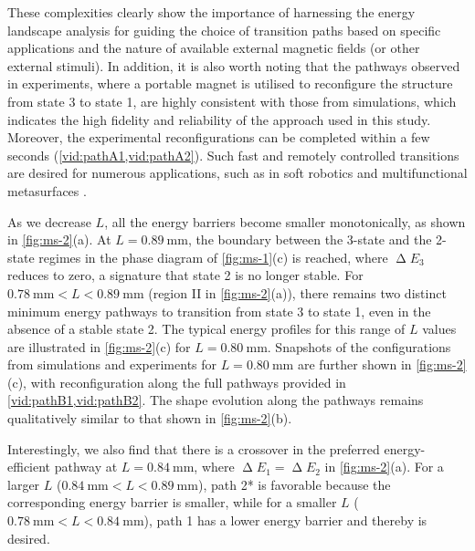 These complexities clearly show the importance of harnessing the energy landscape analysis for guiding the choice of transition paths based on specific applications and the nature of available external magnetic fields (or other external stimuli).
In addition, it is also worth noting that the pathways observed in experiments, where a portable magnet is utilised to reconfigure the structure from state 3 to state 1, are highly consistent with those from simulations, which indicates the high fidelity and reliability of the approach used in this study.
Moreover, the experimental reconfigurations can be completed within a few seconds (\cref{vid:pathA1,vid:pathA2}).
Such fast and remotely controlled transitions are desired for numerous applications, such as in soft robotics \cite{Tang2020,Alapan2020} and multifunctional metasurfaces \cite{Liu2019a,Wang2016}.

As we decrease $L$, all the energy barriers become smaller monotonically, as shown in \cref{fig:ms-2}(a).
At $L = \SI{0.89}{\milli\meter}$, the boundary between the 3-state and the 2-state regimes in the phase diagram of \cref{fig:ms-1}(c) is reached, where $\upDelta E_3$ reduces to zero, a signature that state 2 is no longer stable.
For $\SI{0.78}{\milli\meter} < L < \SI{0.89}{\milli\meter}$ (region II in \cref{fig:ms-2}(a)), there remains two distinct minimum energy pathways to transition from state 3 to state 1, even in the absence of a stable state 2.
The typical energy profiles for this range of $L$ values are illustrated in \cref{fig:ms-2}(c) for $L = \SI{0.80}{\milli\meter}$.
Snapshots of the configurations from simulations and experiments for $L = \SI{0.80}{\milli\meter}$ are further shown in \cref{fig:ms-2}(c), with reconfiguration along the full pathways provided in \cref{vid:pathB1,vid:pathB2}.
The shape evolution along the pathways remains qualitatively similar to that shown in \cref{fig:ms-2}(b).

Interestingly, we also find that there is a crossover in the preferred energy-efficient pathway at $L = \SI{0.84}{\milli\meter}$, where $\upDelta E_1 = \upDelta E_2$ in \cref{fig:ms-2}(a).
For a larger $L$ ($\SI{0.84}{\milli\meter} < L < \SI{0.89}{\milli\meter}$), path 2* is favorable because the corresponding energy barrier is smaller, while for a smaller $L$ ($\SI{0.78}{\milli\meter} < L < \SI{0.84}{\milli\meter}$), path 1 has a lower energy barrier and thereby is desired.

